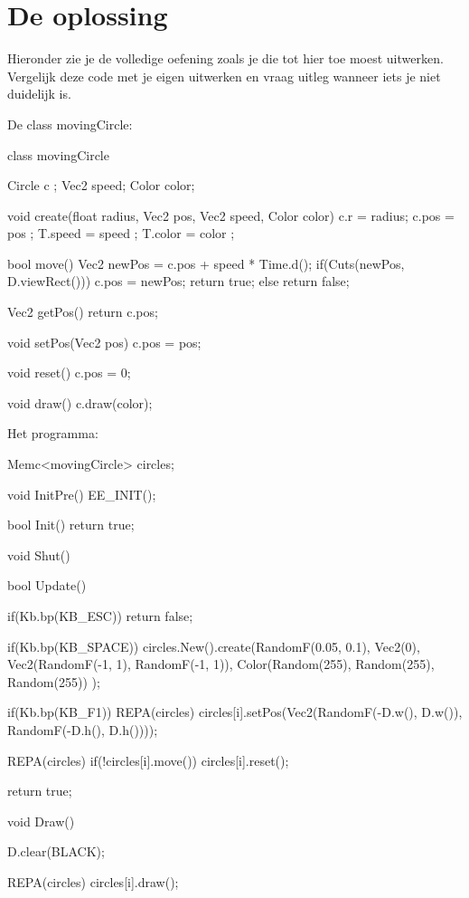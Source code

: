\section{De oplossing}
Hieronder zie je de volledige oefening zoals je die tot hier toe moest uitwerken. Vergelijk deze code met je eigen uitwerken en vraag uitleg wanneer iets je niet duidelijk is.

De class movingCircle:
\begin{code}
class movingCircle
{
   Circle c    ;
   Vec2   speed;
   Color  color;
   
   void create(float radius, Vec2 pos, Vec2 speed, Color color)
   {
      c.r     = radius;
      c.pos   = pos   ;
      T.speed = speed ;
      T.color = color ;
   }
   
   bool move()
   {
      Vec2 newPos = c.pos + speed * Time.d();
      if(Cuts(newPos, D.viewRect()))
      {
         c.pos = newPos;
         return true;
      } else return false;
   }
   
   Vec2 getPos()
   {
      return c.pos;
   }
   
   void setPos(Vec2 pos)
   {
      c.pos = pos;
   }
   
   void reset()
   {
      c.pos = 0;
   }
   
   void draw()
   {
      c.draw(color);
   }
}
\end{code}

Het programma:
\begin{code}
Memc<movingCircle> circles;

void InitPre()
{
   EE_INIT();
}

bool Init()
{ 
   return true;
}

void Shut() {}

bool Update()
{
   if(Kb.bp(KB_ESC)) return false;
  
   if(Kb.bp(KB_SPACE))
   {
      circles.New().create(RandomF(0.05, 0.1), 
                           Vec2(0), 
                           Vec2(RandomF(-1, 1), RandomF(-1, 1)), 
                           Color(Random(255), Random(255), Random(255))
                           );
   }
   
   if(Kb.bp(KB_F1))
   {
      REPA(circles)
      {
         circles[i].setPos(Vec2(RandomF(-D.w(), D.w()), RandomF(-D.h(), D.h())));
      }
   }
   
   REPA(circles)
   {
      if(!circles[i].move()) circles[i].reset();
   }
   
   return true;
}

void Draw()
{
   D.clear(BLACK);
  
   REPA(circles)
   {
      circles[i].draw();
   }
}
\end{code}
